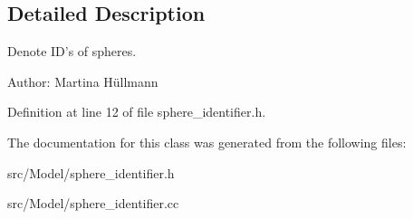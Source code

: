 \subsection{Detailed Description}
Denote ID's of spheres. 

\begin{Desc}
\item[Author:]Martina Hüllmann \end{Desc}


Definition at line 12 of file sphere\_\-identifier.h.

The documentation for this class was generated from the following files:\begin{CompactItemize}
\item 
src/Model/sphere\_\-identifier.h\item 
src/Model/sphere\_\-identifier.cc\end{CompactItemize}

